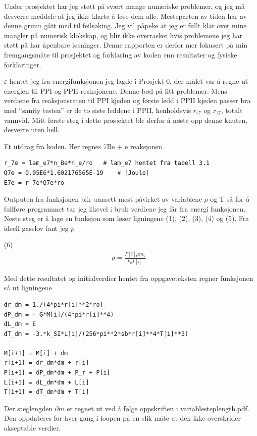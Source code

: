\documentclass[norsk,a4paper,12pt]{article}
\begin{document}
Under prosjektet har jeg støtt på svært mange numeriske problemer, og jeg må desverre meddele at jeg ikke klarte å løse 
dem alle. Mesteparten av tiden har av denne grunn gått med til feilsøking. Jeg vil påpeke at jeg er fullt klar over 
mine mangler på numerisk klokskap, og blir ikke overrasket hvis problemene jeg har støtt på har åpenbare løsninger.
Denne rapporten er derfor mer fokusert på min 
fremgangsmåte til prosjektet og forklaring av koden enn resultater og fysiske forklaringer. 

$\varepsilon $ hentet jeg fra energifunksjonen jeg lagde i Prosjekt 0, der målet var å regne ut 
energien til PPI og PPII reaksjonene. Denne bød på
litt problemer. Mens verdiene fra reaksjonsraten til PPI kjeden og første ledd i PPII kjeden 
passer bra med ``sanity testen'' er de to siste leddene i PPII, henholdsvis $r_{e7} $ og $r_{17} $, totalt vannvid. 
Mitt første steg i dette prosjektet ble derfor å nøste opp denne knuten, desverre uten hell.   

Et utdrag fra koden. Her regnes 7Be + e reaksjonen.
\begin{lstlisting}
r_7e = lam_e7*n_Be*n_e/ro 	# lam_e7 hentet fra tabell 3.1
Q7e = 0.05E6*1.602176565E-19 	# [Joule]
E7e = r_7e*Q7e*ro
\end{lstlisting}

Outputen fra funksjonen blir uansett mest påvirket av variablene $\rho $ og T så for å fullføre programmet tar jeg 
likevel i bruk verdiene jeg får fra energi funksjonen. Neste steg er å lage 
en funksjon som løser ligningene (1), (2), (3), (4) og (5). Fra ideell gasslov fant jeg $\rho $

(6)
\begin{align*}
\rho = \frac{P[i]\mu m_u}{k_bT[i]}
\end{align*}

Med dette resultatet og initialverdier hentet fra oppgaveteksten regner funksjonen så ut ligningene

\begin{lstlisting}
dr_dm = 1./(4*pi*r[i]**2*ro)
dP_dm = - G*M[i]/(4*pi*r[i]**4)
dL_dm = E
dT_dm = -3.*k_SI*L[i]/(256*pi**2*sb*r[i]**4*T[i]**3)

M[i+1] = M[i] + dm
r[i+1] = dr_dm*dm + r[i]
P[i+1] = dP_dm*dm + P_r + P[i]
L[i+1] = dL_dm*dm + L[i]
T[i+1] = dT_dm*dm + T[i]

\end{lstlisting}

Der steglengden $\partial m $ er regnet ut ved å følge oppskriften i variablesteplength.pdf.
Den oppdateres for hver gang i loopen på en slik måte at den ikke overskrider akseptable verdier.
\end{document}
